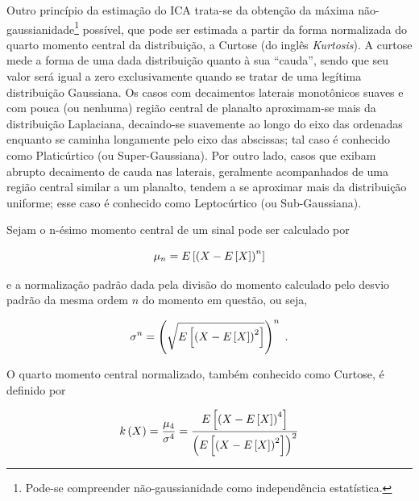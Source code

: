 
Outro princípio da estimação do ICA trata-se da obtenção da máxima não-gaussianidade\footnote{Pode-se compreender não-gaussianidade como independência estatística.} possível, que pode ser estimada a partir da forma normalizada do quarto momento central da distribuição, a Curtose (do inglês \textit{Kurtosis}). A curtose mede a forma de uma dada distribuição quanto à sua ``cauda'', sendo que seu valor será igual a zero exclusivamente quando se tratar de uma legítima distribuição Gaussiana. Os casos com decaimentos laterais monotônicos suaves e com pouca (ou nenhuma) região central de planalto aproximam-se mais da distribuição Laplaciana, decaindo-se suavemente ao longo do eixo das ordenadas enquanto se caminha longamente pelo eixo das abscissas; tal caso é conhecido como Platicúrtico (ou Super-Gaussiana). Por outro lado, casos que exibam abrupto decaimento de cauda nas laterais, geralmente acompanhados de uma região central similar a um planalto, tendem a se aproximar mais da distribuição uniforme; esse caso é conhecido como Leptocúrtico (ou Sub-Gaussiana).\\

\begin{definition}[Curtose]
    Sejam o n-ésimo momento central de um sinal pode ser calculado por

    \begin{equation}
        \mu_{n} = E\left[\left(X - E\left[X\right]\right)^{n}\right]
        \vspace{0.2cm}
    \end{equation}

    \noindent e a normalização padrão dada pela divisão do momento calculado pelo desvio padrão da mesma ordem $n$ do momento em questão, ou seja,

    \begin{equation}
        \sigma^{n} = \left(\sqrt{E\left[\left(X - E\left[X\right]\right)^{2}\right]}\right)^{n}
        \hspace{0.1cm}.
        \vspace{0.2cm}
    \end{equation}

    O quarto momento central normalizado, também conhecido como Curtose, é definido por

    \begin{equation}
        k\left(X\right) = \dfrac{\mu_{4}}{\sigma^{4}} = \dfrac{E\left[\left(X - E\left[X\right]\right)^{4}\right]}{\left(E\left[\left(X - E\left[X\right]\right)^{2}\right]\right)^{2}}
        \vspace{0.2cm}
    \label{eq:bss_curtose}
    \end{equation}

\end{definition}


